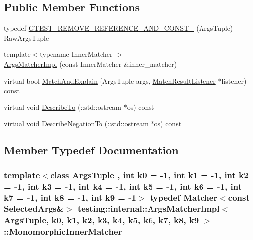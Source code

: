 \subsection*{Public Member Functions}
\begin{DoxyCompactItemize}
\item 
typedef \hyperlink{classtesting_1_1internal_1_1ArgsMatcherImpl_a7b0cadc369c0c20cd254cc2052782301}{G\+T\+E\+S\+T\+\_\+\+R\+E\+M\+O\+V\+E\+\_\+\+R\+E\+F\+E\+R\+E\+N\+C\+E\+\_\+\+A\+N\+D\+\_\+\+C\+O\+N\+S\+T\+\_\+} (Args\+Tuple) Raw\+Args\+Tuple
\item 
{\footnotesize template$<$typename Inner\+Matcher $>$ }\\\hyperlink{classtesting_1_1internal_1_1ArgsMatcherImpl_a7f7a9a826d130d11fe30633d79f59a06}{Args\+Matcher\+Impl} (const Inner\+Matcher \&inner\+\_\+matcher)
\item 
virtual bool \hyperlink{classtesting_1_1internal_1_1ArgsMatcherImpl_a9c9760b144a5e207082fe040c869ad39}{Match\+And\+Explain} (Args\+Tuple args, \hyperlink{classtesting_1_1MatchResultListener}{Match\+Result\+Listener} $\ast$listener) const 
\item 
virtual void \hyperlink{classtesting_1_1internal_1_1ArgsMatcherImpl_a7e2acf3bee2d8038da0f87673bc82eb2}{Describe\+To} (\+::std\+::ostream $\ast$os) const 
\item 
virtual void \hyperlink{classtesting_1_1internal_1_1ArgsMatcherImpl_af22ab8bcd4baee6d1c79751d46240289}{Describe\+Negation\+To} (\+::std\+::ostream $\ast$os) const 
\end{DoxyCompactItemize}


\subsection{Member Typedef Documentation}
\subsubsection[{\texorpdfstring{Monomorphic\+Inner\+Matcher}{MonomorphicInnerMatcher}}]{\setlength{\rightskip}{0pt plus 5cm}template$<$class Args\+Tuple , int k0 = -\/1, int k1 = -\/1, int k2 = -\/1, int k3 = -\/1, int k4 = -\/1, int k5 = -\/1, int k6 = -\/1, int k7 = -\/1, int k8 = -\/1, int k9 = -\/1$>$ typedef {\bf Matcher}$<$const {\bf Selected\+Args}\&$>$ {\bf testing\+::internal\+::\+Args\+Matcher\+Impl}$<$ Args\+Tuple, k0, k1, k2, k3, k4, k5, k6, k7, k8, k9 $>$\+::{\bf Monomorphic\+Inner\+Matcher}}\hypertarget{classtesting_1_1internal_1_1ArgsMatcherImpl_ab90d2c074b2072d6c39bf26209fb941f}{}\label{classtesting_1_1internal_1_1ArgsMatcherImpl_ab90d2c074b2072d6c39bf26209fb941f}
